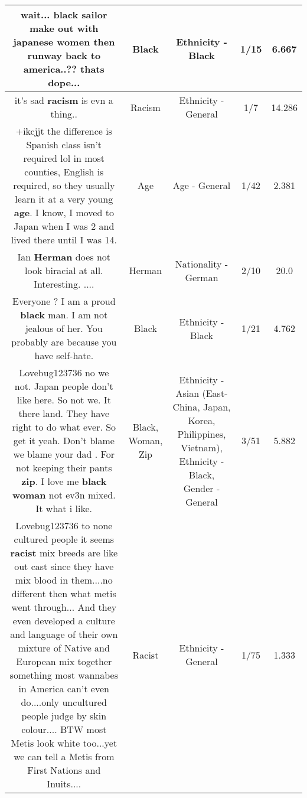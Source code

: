 \documentclass[11pt]{article}
\newlength\mylength
\begin{document}
\begin{center}
\begin{longtable}{|C{.65\mylength}|C{.30\mylength}|C{.12\mylength}|C{.12\mylength}|C{.12\mylength}|}
  \small wait... \textbf{black} sailor make out with japanese women then runway back to america..?? thats dope...\normalsize   & Black & Ethnicity - Black & 1/15 & 6.667 \\  \hline
  \small it's sad \textbf{racism} is evn a thing..\normalsize   & Racism & Ethnicity - General & 1/7 & 14.286 \\  \hline
  \small +ikcjjt the difference is Spanish class isn't required lol in most counties, English is required, so they usually learn it at a very young \textbf{age}. I know, I moved to Japan when I was 2 and lived there until I was 14.\normalsize   & Age & Age - General & 1/42 & 2.381 \\  \hline
  \small Ian \textbf{Herman} does not look biracial at all. Interesting. ....\normalsize   & Herman & Nationality - German & 2/10 & 20.0 \\  \hline
  \small Everyone ? I am a proud \textbf{black} man. I am not jealous of her. You probably are because you have self-hate.\normalsize   & Black & Ethnicity - Black & 1/21 & 4.762 \\  \hline
  \small Lovebug123736 no we not. Japan people don't like here. So not we. It there land. They have right to do what ever. So get it yeah.  Don't blame we blame your dad . For not keeping their pants \textbf{zip}. I love me \textbf{black} \textbf{woman} not ev3n mixed. It what i like.\normalsize   & Black, Woman, Zip & Ethnicity - Asian (East- China, Japan, Korea, Philippines, Vietnam), Ethnicity - Black, Gender - General & 3/51 & 5.882 \\  \hline
  \small Lovebug123736 to none cultured people it seems \textbf{racist} mix breeds are like out cast since they have mix blood in them....no different then what metis went through... And they even developed a culture and language of their own mixture of Native and European mix together something most wannabes in America can't even do....only uncultured people judge by skin colour.... BTW most Metis look white too...yet we can tell a Metis from First Nations and Inuits....\normalsize   & Racist & Ethnicity - General & 1/75 & 1.333 \\  \hline

\end{longtable}
\end{center}
\end{document}
